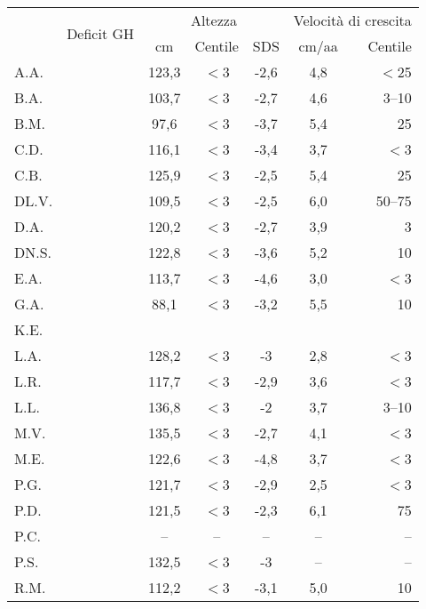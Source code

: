 \begin{table}[!h]
\begin{center}
\addtolength{\tabcolsep}{5pt}
\renewcommand{\arraystretch}{1.1}
\begin{tabular}{lcccccr}
\toprule
 & \multirow{2}{*}{Deficit GH} & \multicolumn{3}{c}{Altezza} & \multicolumn{2}{c}{Velocità di crescita} \\
 \cmidrule(r){3-5}  \cmidrule(r){6-7}
 &    							& cm & Centile  & SDS & cm/aa & Centile \\
A.A.	&  				 		& 123,3 & $<$3  & -2,6 & 4,8 & $<$25  \\
B.A.	& \checkmark 	  				& 103,7 & $<$3  & -2,7 & 4,6 & 3--10   \\
B.M.	& \checkmark 	  				&  97,6 & $<$3  & -3,7 & 5,4 & 25     \\
C.D.	& \checkmark 	  				& 116,1 & $<$3  & -3,4 & 3,7 & $<$3   \\
C.B.	&  				 	        & 125,9 & $<$3  & -2,5 & 5,4 & 25     \\
DL.V.	& \checkmark 	  				& 109,5 & $<$3  & -2,5 & 6,0 & 50--75  \\
D.A.	&  				  		& 120,2 & $<$3  & -2,7 & 3,9 & 3      \\
DN.S.	& \checkmark 	  				& 122,8 & $<$3  & -3,6 & 5,2 & 10     \\
E.A.	&  				  		& 113,7 & $<$3  & -4,6 & 3,0 & $<$3   \\
G.A.	&  				  		&  88,1 & $<$3  & -3,2 & 5,5 & 10     \\
K.E.	&  				  		&       &       &      &     &    \\
L.A.	& \checkmark 	  				& 128,2 & $<$3  & -3   & 2,8 & $<$3   \\
L.R.	&  				  		& 117,7 & $<$3  & -2,9 & 3,6 & $<$3   \\
L.L.	&  				  		& 136,8 & $<$3  & -2   & 3,7 & 3--10   \\
M.V.	& \checkmark 	  				& 135,5 & $<$3  & -2,7 & 4,1 & $<$3   \\
M.E.	&  				  		& 122,6 & $<$3  & -4,8 & 3,7 & $<$3   \\
P.G.	& \checkmark 	  				& 121,7 & $<$3  & -2,9 & 2,5 & $<$3   \\
P.D.	&  				  		& 121,5 & $<$3  & -2,3 & 6,1 & 75     \\
P.C.	&  				  		& --    & --    & --   & --  & --     \\
P.S.	&  				  		& 132,5 & $<$3  & -3   & --  & --     \\
R.M.	& \checkmark 	  				& 112,2 & $<$3  & -3,1 & 5,0 & 10     \\

\end{tabular}
\end{center}
\end{table}
